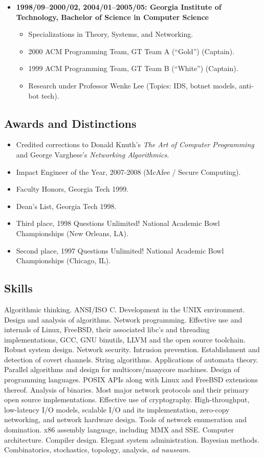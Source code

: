 \documentclass{article}
\newenvironment{tightitemize}
{\begin{itemize}
  \setlength{\itemsep}{1pt}
  \setlength{\parskip}{0pt}
  \setlength{\parsep}{0pt}}
{\end{itemize}}
\begin{document}
\begin{tightitemize}
\item \textbf{1998/09--2000/02, 2004/01--2005/05: Georgia Institute of Technology,
Bachelor of Science in Computer Science}
\begin{tightitemize}
\item Specializations in Theory, Systems, and Networking.
\item 2000 ACM Programming Team, GT Team A (``Gold'') (Captain).
\item 1999 ACM Programming Team, GT Team B (``White'') (Captain).
\item Research under Professor Wenke Lee (Topics: IDS, botnet models, anti-bot tech).
\end{tightitemize}
\end{tightitemize}

\vspace{2mm}
\subsection*{Awards and Distinctions}
\begin{tightitemize}
\item Credited corrections to Donald Knuth's \textit{The Art of Computer Programming}
   and George Varghese's \textit{Networking Algorithmics}.
\item Impact Engineer of the Year, 2007-2008 (McAfee / Secure Computing).
\item Faculty Honors, Georgia Tech 1999.
\item Dean's List, Georgia Tech 1998.
\item Third place, 1998 Questions Unlimited! National Academic Bowl Championships (New Orleans, LA).
\item Second place, 1997 Questions Unlimited! National Academic Bowl Championships (Chicago, IL).
\end{tightitemize}

\vspace{2mm}
\subsection*{Skills}
Algorithmic thinking. ANSI/ISO C. Development in the UNIX environment. Design
and analysis of algorithms. Network programming. Effective use and internals
of Linux, FreeBSD, their associated libc's and threading implementations,
GCC, GNU binutils, LLVM and the open source toolchain. Robust system design. 
Network security. Intrusion prevention. Establishment and detection of covert
channels. String algorithms. Applications of automata theory. Parallel
algorithms and design for multicore/manycore machines. Design
of programming languages. POSIX APIs along with Linux and FreeBSD
extensions thereof. Analysis of binaries. Most major network protocols and
their primary open source implementations. Effective use of cryptography. 
High-throughput, low-latency I/O models, scalable I/O and its implementation,
zero-copy networking, and network hardware design. Tools of network
enumeration and domination. x86 assembly language, including MMX and SSE. 
Computer architecture. Compiler design. Elegant system administration. 
Bayesian methods. Combinatorics, stochastics, topology, analysis, \textit{ad nauseam}. 
\end{document}
